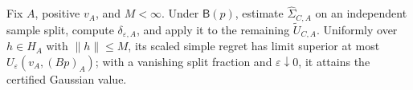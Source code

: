 Fix \(A\), positive \(v_A\), and \(M<\infty\). Under \(\mathsf B(p)\), estimate \(\widehat\Sigma_{C,A}\) on an independent sample split, compute \(\delta_{\varepsilon,A}\), and apply it to the remaining \(\widetilde U_{C,A}\). Uniformly over \(h\in H_A\) with \(\lVert h\rVert\leq M\), its scaled simple regret has limit superior at most \(U_\varepsilon(v_A,(Bp)_A)\); with a vanishing split fraction and \(\varepsilon\downarrow0\), it attains the certified Gaussian value.